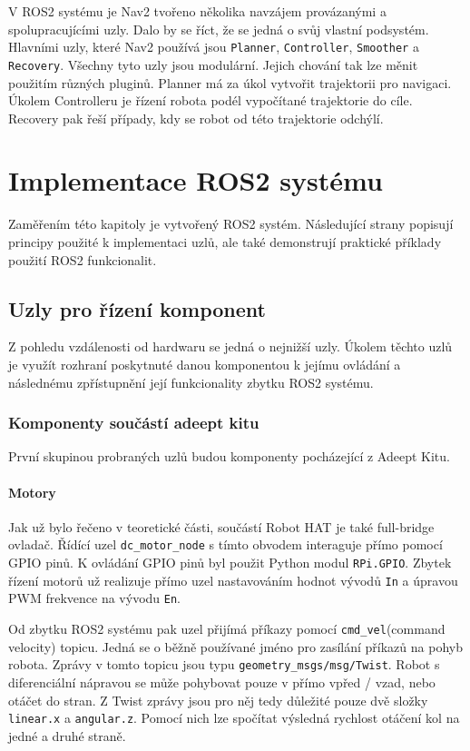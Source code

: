 V ROS2 systému je Nav2 tvořeno několika navzájem provázanými a spolupracujícími uzly. Dalo by se říct, že se jedná o svůj vlastní podsystém. Hlavními uzly, které Nav2 používá jsou \verb|Planner|, \verb|Controller|, \verb|Smoother| a \verb|Recovery|. Všechny tyto uzly jsou modulární. Jejich chování tak lze měnit použitím různých pluginů. Planner má za úkol vytvořit trajektorii pro navigaci. Úkolem Controlleru je řízení robota podél vypočítané trajektorie do cíle. Recovery pak řeší případy, kdy se robot od této trajektorie odchýlí. \cite{nav2_documentation}

\chapter{Implementace ROS2 systému}
Zaměřením této kapitoly je vytvořený ROS2 systém. Následující strany popisují principy použité k implementaci uzlů, ale také demonstrují praktické příklady použití ROS2 funkcionalit.

\section{Uzly pro řízení komponent}
Z pohledu vzdálenosti od hardwaru se jedná o nejnižší uzly. Úkolem těchto uzlů je využít rozhraní poskytnuté danou komponentou k jejímu ovládání a následnému zpřístupnění její funkcionality zbytku ROS2 systému.

\subsection*{Komponenty součástí adeept kitu}
První skupinou probraných uzlů budou komponenty pocházející z Adeept Kitu.

\subsubsection*{Motory}
Jak už bylo řečeno v teoretické části, součástí Robot HAT je také full-bridge ovladač. Řídící uzel \verb|dc_motor_node| s tímto obvodem interaguje přímo pomocí GPIO pinů. K ovládání GPIO pinů byl použit Python modul \verb|RPi.GPIO|. Zbytek řízení motorů už realizuje přímo uzel nastavováním hodnot vývodů \verb|In| a úpravou PWM frekvence na vývodu \verb|En|.

Od zbytku ROS2 systému pak uzel přijímá příkazy pomocí \verb|cmd_vel|(command velocity) topicu. Jedná se o běžně používané jméno pro zasílání příkazů na pohyb robota. Zprávy v tomto topicu jsou typu \verb|geometry_msgs/msg/Twist|. Robot s diferenciální nápravou se může pohybovat pouze v přímo vpřed / vzad, nebo otáčet do stran. Z Twist zprávy jsou pro něj tedy důležité pouze dvě složky \verb|linear.x| a \verb|angular.z|. Pomocí nich lze spočítat výsledná rychlost otáčení kol na jedné a druhé straně.

